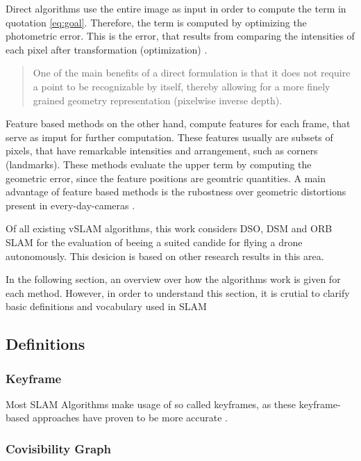 Direct algorithms use the entire image as input in order to compute the term in quotation \ref{eq:goal}. Therefore, the term is computed by optimizing the photometric error. 
This is the error, that results from comparing the intensities of each pixel after transformation (optimization) \cite{dso}. 

  \begin{quote}
	One of the main benefits of a direct formulation is that it
	does not require a point to be recognizable by itself, thereby
	allowing for a more finely grained geometry representation (pixelwise inverse depth). \cite{dso}
  \end{quote}

Feature based methods on the other hand, compute features for each frame, that serve as imput for further computation. These features usually are subsets of pixels, that have remarkable 
intensities and arrangement, such as corners (landmarks). These methods evaluate the upper term by computing the geometric error, since the feature positions are geomtric 
quantities. A main advantage of feature based methods is the rubostness over geometric distortions present in every-day-cameras \cite{dso}. 

Of all existing vSLAM algorithms, this work considers DSO, DSM and ORB SLAM for the evaluation of beeing a suited candide for flying a drone autonomously. This desicion is based on 
other research results in this area. %

In the following section, an overview over how the algorithms work is given for each method. However, in order to understand this section, it is crutial to clarify basic definitions 
and vocabulary used in SLAM

	\subsection{Definitions}
		
		\subsubsection{Keyframe}
		
		Most SLAM Algorithms make usage of so called keyframes, as these keyframe-based approaches have proven to be more accurate \cite{keyframe}. 
	
		\subsubsection{Covisibility Graph}
		

